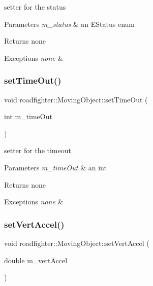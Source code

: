 setter for the status 
\begin{DoxyParams}{Parameters}
{\em m\+\_\+status} & an E\+Status enum \\
\hline
\end{DoxyParams}
\begin{DoxyReturn}{Returns}
none 
\end{DoxyReturn}

\begin{DoxyExceptions}{Exceptions}
{\em none} & \\
\hline
\end{DoxyExceptions}
\mbox{\label{classroadfighter_1_1MovingObject_a3e0c64a4f67f03e84fc388127123c2df}} 
\subsubsection{\texorpdfstring{set\+Time\+Out()}{setTimeOut()}}
{\footnotesize\ttfamily void roadfighter\+::\+Moving\+Object\+::set\+Time\+Out (\begin{DoxyParamCaption}\item[{int}]{m\+\_\+time\+Out }\end{DoxyParamCaption})}

setter for the timeout 
\begin{DoxyParams}{Parameters}
{\em m\+\_\+time\+Out} & an int \\
\hline
\end{DoxyParams}
\begin{DoxyReturn}{Returns}
none 
\end{DoxyReturn}

\begin{DoxyExceptions}{Exceptions}
{\em none} & \\
\hline
\end{DoxyExceptions}
\mbox{\label{classroadfighter_1_1MovingObject_a52313182d28796bf27762047c8b289fd}} 
\subsubsection{\texorpdfstring{set\+Vert\+Accel()}{setVertAccel()}}
{\footnotesize\ttfamily void roadfighter\+::\+Moving\+Object\+::set\+Vert\+Accel (\begin{DoxyParamCaption}\item[{double}]{m\+\_\+vert\+Accel }\end{DoxyParamCaption})}

